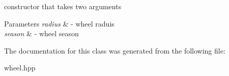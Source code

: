 constructor that takes two arguments 


\begin{DoxyParams}{Parameters}
{\em radius} & -\/ wheel raduis \\
\hline
{\em season} & -\/ wheel season \\
\hline
\end{DoxyParams}


The documentation for this class was generated from the following file\+:\begin{DoxyCompactItemize}
\item 
wheel.\+hpp\end{DoxyCompactItemize}
